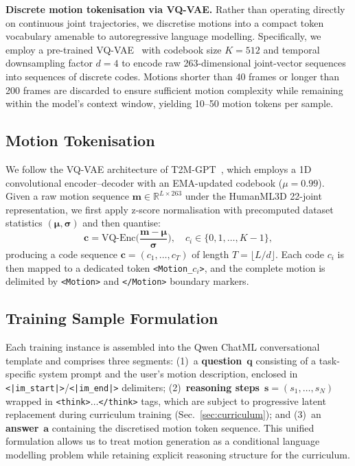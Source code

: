 \noindent\textbf{Discrete motion tokenisation via VQ-VAE\@.}
Rather than operating directly on continuous joint trajectories, we
discretise motions into a compact token vocabulary amenable to
autoregressive language modelling.
Specifically, we employ a pre-trained VQ-VAE~\cite{zhang2023generating}
with codebook size $K{=}512$ and temporal downsampling factor $d{=}4$
to encode raw 263-dimensional joint-vector sequences into sequences of
discrete codes.
Motions shorter than 40 frames or longer than 200 frames are discarded to
ensure sufficient motion complexity while remaining within the model's
context window, yielding 10--50 motion tokens per sample.

\subsection{Motion Tokenisation}
\label{sec:vqvae}

We follow the VQ-VAE architecture of T2M-GPT~\cite{zhang2023generating},
which employs a 1D convolutional encoder--decoder with an EMA-updated
codebook ($\mu{=}0.99$).
Given a raw motion sequence $\mathbf{m}\in\mathbb{R}^{L\times 263}$
under the HumanML3D 22-joint representation, we first apply z-score
normalisation with precomputed dataset statistics
$(\boldsymbol{\mu},\boldsymbol{\sigma})$ and then quantise:
%
\begin{equation}
  \mathbf{c}
  = \mathrm{VQ\text{-}Enc}\!\bigg(\frac{\mathbf{m}-\boldsymbol{\mu}}
    {\boldsymbol{\sigma}}\bigg),
  \quad c_i\in\{0,1,\ldots,K{-}1\},
  \label{eq:vqvae_enc}
\end{equation}
%
producing a code sequence $\mathbf{c}=(c_1,\ldots,c_T)$ of length
$T{=}\lfloor L/d\rfloor$.
Each code $c_i$ is then mapped to a dedicated token
\texttt{<Motion\_$c_i$>}, and the complete motion is delimited by
\texttt{<Motion>} and \texttt{</Motion>} boundary markers.

\subsection{Training Sample Formulation}
\label{sec:data_format}

Each training instance is assembled into the Qwen ChatML conversational
template and comprises three segments:
(1)~a \textbf{question}~$\mathbf{q}$ consisting of a task-specific system
prompt and the user's motion description, enclosed in
\texttt{<|im\_start|>}/\texttt{<|im\_end|>} delimiters;
(2)~\textbf{reasoning steps}~$\mathbf{s}{=}(s_1,\ldots,s_N)$ wrapped in
\texttt{<think>}$\ldots$\texttt{</think>} tags, which are subject to
progressive latent replacement during curriculum training
(Sec.~\ref{sec:curriculum}); and
(3)~an \textbf{answer}~$\mathbf{a}$ containing the discretised motion
token sequence.
This unified formulation allows us to treat motion generation as a
conditional language modelling problem while retaining explicit reasoning
structure for the curriculum.

